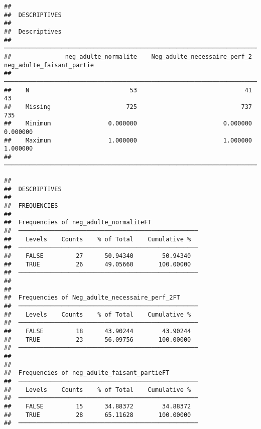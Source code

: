 \documentclass[
]{article}
\begin{document}
\begin{verbatim}
## 
##  DESCRIPTIVES
## 
##  Descriptives                                                                                     
##  ──────────────────────────────────────────────────────────────────────────────────────────────── 
##               neg_adulte_normalite    Neg_adulte_necessaire_perf_2    neg_adulte_faisant_partie   
##  ──────────────────────────────────────────────────────────────────────────────────────────────── 
##    N                            53                              41                           43   
##    Missing                     725                             737                          735   
##    Minimum                0.000000                        0.000000                     0.000000   
##    Maximum                1.000000                        1.000000                     1.000000   
##  ────────────────────────────────────────────────────────────────────────────────────────────────
\end{verbatim}

\begin{verbatim}
## 
##  DESCRIPTIVES
## 
##  FREQUENCIES
## 
##  Frequencies of neg_adulte_normaliteFT              
##  ────────────────────────────────────────────────── 
##    Levels    Counts    % of Total    Cumulative %   
##  ────────────────────────────────────────────────── 
##    FALSE         27      50.94340        50.94340   
##    TRUE          26      49.05660       100.00000   
##  ────────────────────────────────────────────────── 
## 
## 
##  Frequencies of Neg_adulte_necessaire_perf_2FT      
##  ────────────────────────────────────────────────── 
##    Levels    Counts    % of Total    Cumulative %   
##  ────────────────────────────────────────────────── 
##    FALSE         18      43.90244        43.90244   
##    TRUE          23      56.09756       100.00000   
##  ────────────────────────────────────────────────── 
## 
## 
##  Frequencies of neg_adulte_faisant_partieFT         
##  ────────────────────────────────────────────────── 
##    Levels    Counts    % of Total    Cumulative %   
##  ────────────────────────────────────────────────── 
##    FALSE         15      34.88372        34.88372   
##    TRUE          28      65.11628       100.00000   
##  ──────────────────────────────────────────────────
\end{verbatim}
\end{document}
